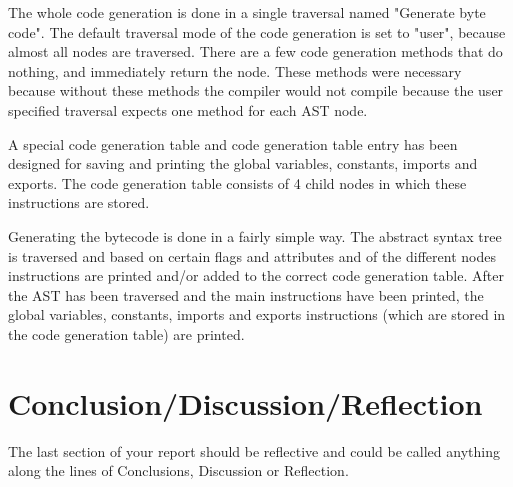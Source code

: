 \documentclass{uva-inf-article}
\begin{document}
\par The whole code generation is done in a single traversal named "Generate byte code".
The default traversal mode of the code generation is set to "user", because almost all nodes are traversed.
There are a few code generation methods that do nothing, and immediately return the node. 
These methods were necessary because without these methods the compiler would not compile because the user specified traversal expects one method for each AST node.

\par A special code generation table and code generation table entry has been designed for saving and printing the global variables, constants, imports and exports. 
The code generation table consists of 4 child nodes in which these instructions are stored.

\par Generating the bytecode is done in a fairly simple way.
The abstract syntax tree is traversed and based on certain flags and attributes and of the different 
nodes instructions are printed and/or added to the correct code generation table.
After the AST has been traversed and the main instructions have been printed, the global variables, constants, 
imports and exports instructions (which are stored in the code generation table) are printed.

\section{Conclusion/Discussion/Reflection}
\par The last section of your report should be reflective and could be called
anything along the lines of Conclusions, Discussion or Reflection. 




\end{document}
